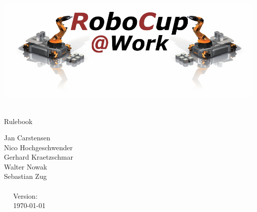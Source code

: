 \begin{titlepage}
  \begin{center}
    {
      
      \includegraphics[width=\textwidth]{images/logo_RoboCupAtWork.pdf}\\[1.23ex]
    }
    \vspace{2.7 cm}
    \hrulefill\par
    {%
      \vspace*{.27cm}
      \Huge{\RCAW}\\[1.23ex]
      \Large Rulebook \\[2ex]
    }
    



    \hrulefill\par
    
    \vfill

    
	Jan Carstensen\\
	Nico Hochgeschwender\\
	Gerhard Kraetzschmar\\
	Walter Nowak\\
	Sebastian Zug\\
	\\
    
    \vfill
    ~~ Version: \YEAR ~~ \\
    ~~  \today ~~ \\
  \end{center}
\end{titlepage}
